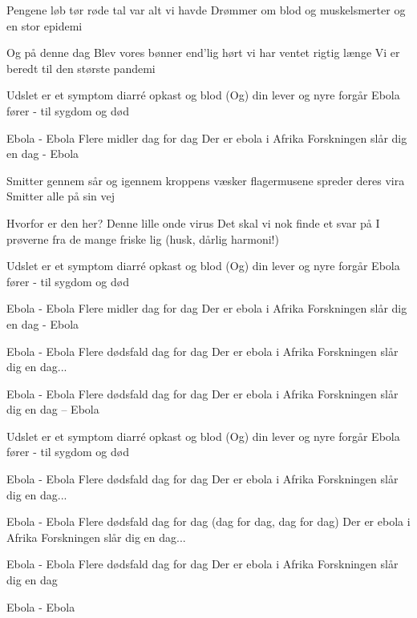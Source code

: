 \documentclass[a4paper,11pt]{article}
\begin{document}
\begin{song}
Pengene løb tør
røde tal var alt vi havde
Drømmer om blod og muskelsmerter
og en stor epidemi

Og på denne dag
Blev vores bønner end'lig hørt
vi har ventet rigtig længe
Vi er beredt til den største pandemi

Udslet er et symptom
diarré opkast og blod
(Og) din lever og nyre forgår
Ebola fører - til sygdom og død

Ebola - Ebola
Flere midler dag for dag
Der er ebola i Afrika
Forskningen slår dig en dag - Ebola

Smitter gennem sår
og igennem kroppens væsker
flagermusene spreder deres vira
Smitter alle på sin vej

Hvorfor er den her?
Denne lille onde virus
Det skal vi nok finde et svar på
I prøverne fra de mange friske lig (husk, dårlig harmoni!)

Udslet er et symptom
diarré opkast og blod
(Og) din lever og nyre forgår
Ebola fører - til sygdom og død

Ebola - Ebola
Flere midler dag for dag
Der er ebola i Afrika
Forskningen slår dig en dag -  Ebola

Ebola - Ebola
Flere dødsfald dag for dag
Der er ebola i Afrika
Forskningen slår dig en dag...

Ebola - Ebola
Flere dødsfald dag for dag
Der er ebola i Afrika
Forskningen slår dig en dag – Ebola

Udslet er et symptom
diarré opkast og blod
(Og) din lever og nyre forgår
Ebola fører - til sygdom og død

Ebola - Ebola
Flere dødsfald dag for dag
Der er ebola i Afrika
Forskningen slår dig en dag...

Ebola - Ebola
Flere dødsfald dag for dag (dag for dag, dag for dag)
Der er ebola i Afrika
Forskningen slår dig en dag...

Ebola - Ebola
Flere dødsfald dag for dag
Der er ebola i Afrika
Forskningen slår dig en dag

Ebola - Ebola

\end{song}
\end{document}
